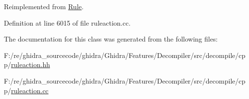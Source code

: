 Reimplemented from \mbox{\hyperlink{class_rule_a4023bfc7825de0ab866790551856d10e}{Rule}}.



Definition at line 6015 of file ruleaction.\+cc.



The documentation for this class was generated from the following files\+:\begin{DoxyCompactItemize}
\item 
F\+:/re/ghidra\+\_\+sourcecode/ghidra/\+Ghidra/\+Features/\+Decompiler/src/decompile/cpp/\mbox{\hyperlink{ruleaction_8hh}{ruleaction.\+hh}}\item 
F\+:/re/ghidra\+\_\+sourcecode/ghidra/\+Ghidra/\+Features/\+Decompiler/src/decompile/cpp/\mbox{\hyperlink{ruleaction_8cc}{ruleaction.\+cc}}\end{DoxyCompactItemize}
